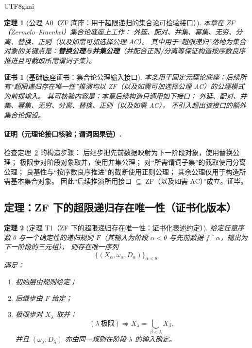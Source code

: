 \documentclass[12pt]{article}
\newtheorem{theorem}{定理}[section]
\newtheorem{Certificate}{证书}[section]
\newcommand{\KouJing}{\texorpdfstring{表述约定}{表述约定}}
\begin{document}
\begin{CJK*}{UTF8}{gkai}
\begin{theorem}[公理 A0（ZF 底座：用于超限递归的集合论可检验接口）]
\label{thm:tex29-top-zf-base}
本章在 ZF（Zermelo--Fraenkel）集合论底座上工作：
外延、配对、并集、幂集、无穷、分离、替换、正则（以及如需可加选择公理 AC）。
其中用于“超限递归”落地为集合对象的关键点是：\textbf{替换公理}与\textbf{并集公理}（并配合正则/分离等保证构造按序数良序推进且可截取所需谓词子集）。
\end{theorem}

\begin{Certificate}[基础底座证书：集合论公理输入接口]
\label{cert:tex29-top-zf-base}
本条用于固定元理论底座：后续所有“超限递归存在唯一性”推演均以 ZF（以及如需可加选择公理 AC）的公理模式为前提输入。
其可核验内容是：本章后续构造只调用如下接口：
外延、配对、并集、幂集、无穷、分离、替换、正则（以及如需 AC），
不引入超出该接口的额外集合论假设。
\end{Certificate}

\paragraph{证明（元理论接口核验；谓词因果链）.}
检查定理~\ref{thm:tex29-top-transfinite-recursion} 的构造步骤：
后继步把先前数据映射为下一阶段对象，使用替换公理；
极限步对阶段对象取并，使用并集公理；
对“所需谓词子集”的截取使用分离公理；
良基性与“按序数良序推进”的截断使用正则公理；
其余公理仅用于构造所需基本集合对象。
因此“后续推演所用接口 $\subseteq$ ZF（以及如需 AC）”成立。证毕。

\subsection{定理：ZF 下的超限递归存在唯一性（证书化版本）}
\label{subsec:tex29-top-transfinite-recursion}

\begin{theorem}[定理 T1（ZF 下的超限递归存在唯一性：证书化\KouJing）]
\label{thm:tex29-top-transfinite-recursion}
给定任意序数 $\theta$ 与一个确定性的递归规则 $F$（其输入为阶段 $\alpha<\theta$ 与先前数据 $f\upharpoonright \alpha$，输出为下一阶段的三元组），
则存在唯一序列
\[
  \bigl\{(X_\alpha,\omega_\alpha,D_\alpha)\bigr\}_{\alpha<\theta}
\]
满足：
\begin{enumerate}
  \item 初始层由规则给定；
  \item 后继步由 $F$ 给定；
  \item 极限步对 $X_\lambda$ 取并：
  \[
    (\lambda\ \text{极限})\Rightarrow X_\lambda=\bigcup_{\beta<\lambda}X_\beta,
  \]
  并且 $(\omega_\lambda,D_\lambda)$ 亦由同一规则在阶段 $\lambda$ 的输入确定。
\end{enumerate}
\end{theorem}


\end{CJK*}
\end{document}
